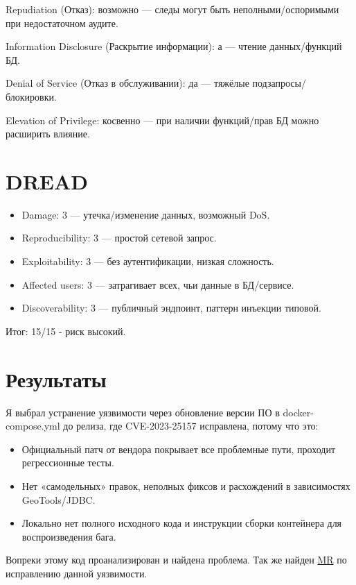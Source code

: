 \documentclass{article}
\begin{document}
Repudiation (Отказ): возможно — следы могут быть неполными/оспоримыми при недостаточном аудите.

Information Disclosure (Раскрытие информации): а — чтение данных/функций БД.

Denial of Service (Отказ в обслуживании): да — тяжёлые подзапросы/блокировки.

Elevation of Privilege: косвенно — при наличии функций/прав БД можно расширить влияние.

\section{DREAD}

\begin{itemize}
  \item Damage: 3 — утечка/изменение данных, возможный DoS.
  \item Reproducibility: 3 — простой сетевой запрос.
  \item Exploitability: 3 — без аутентификации, низкая сложность.
  \item Affected users: 3 — затрагивает всех, чьи данные в БД/сервисе.
  \item Discoverability: 3 — публичный эндпоинт, паттерн инъекции типовой.
\end{itemize}

Итог: 15/15 - риск высокий.

\section*{Результаты}

Я выбрал устранение уязвимости через обновление версии ПО в docker-compose.yml до релиза, где CVE-2023-25157 исправлена, потому что это:

\begin{itemize}
  \item Официальный патч от вендора покрывает все проблемные пути, проходит регрессионные тесты.
  \item Нет «самодельных» правок, неполных фиксов и расхождений в зависимостях GeoTools/JDBC.
  \item Локально нет полного исходного кода и инструкции сборки контейнера для воспроизведения бага.
\end{itemize}

Вопреки этому код проанализирован и найдена проблема. Так же найден \href{https://github.com/geoserver/geoserver/commit/145a8af798590288d270b240235e89c8f0b62e1d}{MR}
по исправлению данной уязвимости.
\end{document}
